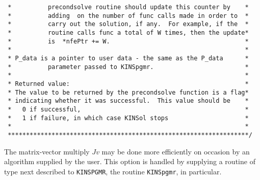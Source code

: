 \begin{verbatim}
 *          precondsolve routine should update this counter by    *
 *          adding  on the number of func calls made in order to  *
 *          carry out the solution, if any.  For example, if the  *
 *          routine calls func a total of W times, then the update*
 *          is  *nfePtr += W.                                     *
 *                                                                *
 * P_data is a pointer to user data - the same as the P_data      *
 *          parameter passed to KINSpgmr.                         *
 *                                                                *
 * Returned value:                                                *
 * The value to be returned by the precondsolve function is a flag*
 * indicating whether it was successful.  This value should be    *
 *   0 if successful,                                             *
 *   1 if failure, in which case KINSol stops                     *
 *                                                                *
 ******************************************************************/

\end{verbatim}
\normalsize
  
The matrix-vector multiply $J v$ may be done more efficiently on
occasion by an algorithm supplied by the user. This option is handled
by supplying a routine of type next described to {\tt KINSPGMR}, the
routine {\tt KINSpgmr}, in particular.

